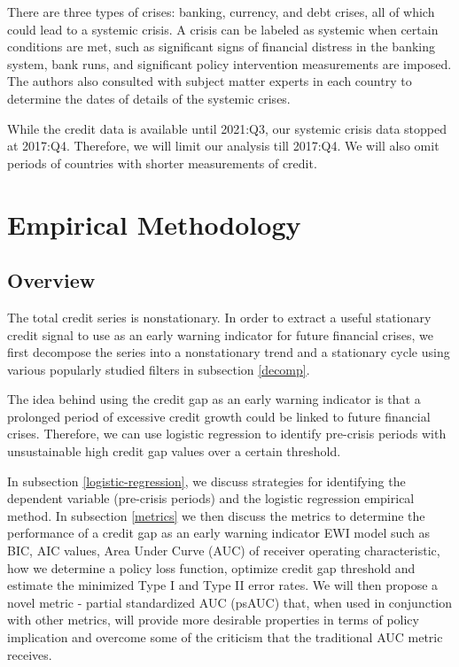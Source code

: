 \documentclass[
  12pt,
]{article}
\begin{document}
There are three types of crises: banking, currency, and debt crises, all of which could lead to a systemic crisis. A crisis can be labeled as systemic when certain conditions are met, such as significant signs of financial distress in the banking system, bank runs, and significant policy intervention measurements are imposed. The authors also consulted with subject matter experts in each country to determine the dates of details of the systemic crises.

While the credit data is available until 2021:Q3, our systemic crisis data stopped at 2017:Q4. Therefore, we will limit our analysis till 2017:Q4. We will also omit periods of countries with shorter measurements of credit.

\hypertarget{model}{%
\section{Empirical Methodology}\label{model}}

\hypertarget{overview}{%
\subsection{Overview}\label{overview}}

The total credit series is nonstationary. In order to extract a useful stationary credit signal to use as an early warning indicator for future financial crises, we first decompose the series into a nonstationary trend and a stationary cycle using various popularly studied filters in subsection \ref{decomp}.

The idea behind using the credit gap as an early warning indicator is that a prolonged period of excessive credit growth could be linked to future financial crises. Therefore, we can use logistic regression to identify pre-crisis periods with unsustainable high credit gap values over a certain threshold.

In subsection \ref{logistic-regression}, we discuss strategies for identifying the dependent variable (pre-crisis periods) and the logistic regression empirical method. In subsection \ref{metrics} we then discuss the metrics to determine the performance of a credit gap as an early warning indicator EWI model such as BIC, AIC values, Area Under Curve (AUC) of receiver operating characteristic, how we determine a policy loss function, optimize credit gap threshold and estimate the minimized Type I and Type II error rates. We will then propose a novel metric - partial standardized AUC (psAUC) that, when used in conjunction with other metrics, will provide more desirable properties in terms of policy implication and overcome some of the criticism that the traditional AUC metric receives.
\end{document}
